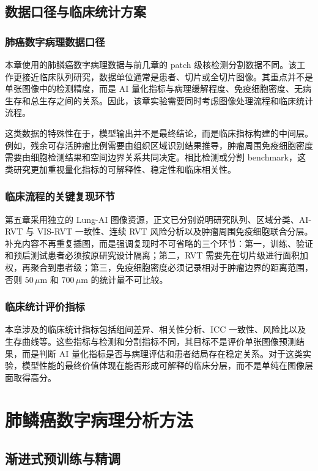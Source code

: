 \subsection{数据口径与临床统计方案}
\subsubsection{肺癌数字病理数据口径}
本章使用的肺鳞癌数字病理数据与前几章的 patch 级核检测分割数据不同。该工作更接近临床队列研究，数据单位通常是患者、切片或全切片图像。其重点并不是单张图像中的检测精度，而是 AI 量化指标与病理缓解程度、免疫细胞密度、无病生存和总生存之间的关系。因此，该章实验需要同时考虑图像处理流程和临床统计流程。

这类数据的特殊性在于，模型输出并不是最终结论，而是临床指标构建的中间层。例如，残余可存活肿瘤比例需要由组织区域识别结果推导，肿瘤周围免疫细胞密度需要由细胞检测结果和空间边界关系共同决定。相比检测或分割 benchmark，这类研究更加重视量化指标的可解释性、稳定性和临床相关性。

\subsubsection{临床流程的关键复现环节}
第五章采用独立的 Lung-AI 图像资源，正文已分别说明研究队列、区域分类、AI-RVT 与 VIS-RVT 一致性、连续 RVT 风险分析以及肿瘤周围免疫细胞联合分层。补充内容不再重复插图，而是强调复现时不可省略的三个环节：第一，训练、验证和预后测试患者必须按原研究设计隔离；第二，RVT 需要先在切片级进行面积加权，再聚合到患者级；第三，免疫细胞密度必须记录相对于肿瘤边界的距离范围，否则 $50\,\mu\mathrm{m}$ 和 $700\,\mu\mathrm{m}$ 的统计量不可比较。

\subsubsection{临床统计评价指标}
本章涉及的临床统计指标包括组间差异、相关性分析、ICC 一致性、风险比以及生存曲线等。这些指标与检测和分割指标不同，其目标不是评价单张图像预测结果，而是判断 AI 量化指标是否与病理评估和患者结局存在稳定关系。对于这类实验，模型性能的最终价值体现在能否形成可解释的临床分层，而不是单纯在图像层面取得高分。

\section{肺鳞癌数字病理分析方法}
\subsection{渐进式预训练与精调}

